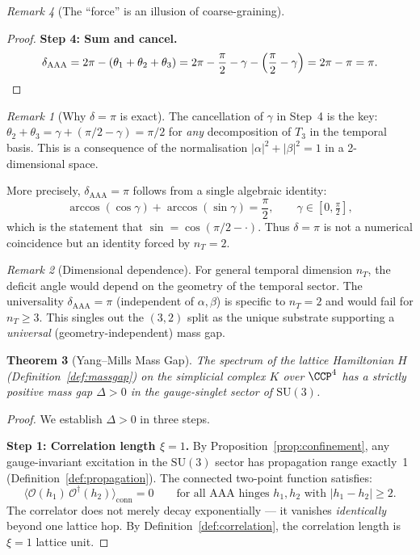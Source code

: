 \documentclass[12pt]{article}
\newtheorem{theorem}{Theorem}[section]
\theoremstyle{remark}
\newtheorem{remark}[theorem]{Remark}
\theoremstyle{definition}
\begin{document}
\begin{remark}[The ``force'' is an illusion of coarse-graining]
\begin{proof}
\medskip\noindent
\textbf{Step 4: Sum and cancel.}
\begin{equation}
\delta_{\mathrm{AAA}} = 2\pi - (\theta_1 + \theta_2 + \theta_3)
= 2\pi - \frac{\pi}{2} - \gamma - \Bigl(\frac{\pi}{2} - \gamma\Bigr)
= 2\pi - \pi = \pi. \qedhere
\end{equation}
\end{proof}

\begin{remark}[Why $\delta = \pi$ is exact]
The cancellation of $\gamma$ in Step~4 is the key: $\theta_2 + \theta_3
= \gamma + (\pi/2 - \gamma) = \pi/2$ for \emph{any} decomposition of
$T_3$ in the temporal basis.  This is a consequence of the normalisation
$|\alpha|^2 + |\beta|^2 = 1$ in a 2-dimensional space.

More precisely, $\delta_{\mathrm{AAA}} = \pi$ follows from a single
algebraic identity:
\begin{equation}
\arccos(\cos\gamma) + \arccos(\sin\gamma) = \frac{\pi}{2},
\qquad \gamma \in [0, \tfrac{\pi}{2}],
\end{equation}
which is the statement that $\sin = \cos(\pi/2 - \cdot)$.  Thus
$\delta = \pi$ is not a numerical coincidence but an identity forced by
$n_T = 2$.
\end{remark}

\begin{remark}[Dimensional dependence]
For general temporal dimension $n_T$, the deficit angle would depend on
the geometry of the temporal sector. The universality
$\delta_{\mathrm{AAA}} = \pi$ (independent of $\alpha, \beta$) is
specific to $n_T = 2$ and would fail for $n_T \geq 3$.  This
singles out the $(3,2)$ split as the unique substrate supporting a
\emph{universal} (geometry-independent) mass gap.
\end{remark}

\begin{theorem}[Yang--Mills Mass Gap]
\label{thm:massgap}
The spectrum of the lattice Hamiltonian $H$
(Definition~\ref{def:massgap}) on the simplicial complex $K$
over $\CCP^4$ has a strictly positive mass gap $\Delta > 0$
in the gauge-singlet sector of $\mathrm{SU}(3)$.
\end{theorem}

\begin{proof}
We establish $\Delta > 0$ in three steps.

\medskip\noindent
\textbf{Step 1: Correlation length $\xi = 1$.}
By Proposition~\ref{prop:confinement}, any gauge-invariant excitation
in the $\mathrm{SU}(3)$ sector has propagation range exactly~1
(Definition~\ref{def:propagation}).  The connected two-point function
satisfies:
\begin{equation}
\langle \mathcal{O}(h_1)\,\mathcal{O}^\dagger(h_2)
\rangle_{\mathrm{conn}} = 0 \qquad
\text{for all AAA hinges } h_1, h_2 \text{ with } |h_1 - h_2| \geq 2.
\end{equation}
The correlator does not merely decay exponentially --- it vanishes
\emph{identically} beyond one lattice hop.  By
Definition~\ref{def:correlation}, the correlation length is
$\xi = 1$ lattice unit.


\end{proof}
\end{remark}
\end{document}
